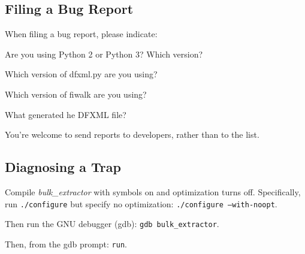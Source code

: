 \documentclass[10pt,twoside]{article}
\newcommand{\bulk}{\emph{bulk\_extractor}\xspace}
\newcommand{\bev}{\emph{BEViewer}\xspace}
\begin{document}
\subsection{Filing a Bug Report}
When filing a bug report, please indicate:
\begin{compactenum}
\item Are you using Python 2 or Python 3? Which version?
\item Which version of dfxml.py are you using?
\item Which  version of fiwalk are you using?
\item What generated he DFXML file?
\end{compactenum}
You're welcome to send reports to developers, rather than to the list.

\subsection{Diagnosing a Trap}
\begin{compactenum}
\item Compile \bulk with symbols on and optimization turns off.
Specifically, run \texttt{./configure}
but specify no optimization: \texttt{./configure --with-noopt}.
\item Then run the GNU debugger (gdb): \texttt{gdb bulk\_extractor}.
\item Then, from the gdb prompt: \texttt{run}.
\end{compactenum}


\cleardoublepage



\cleardoublepage
\printglossaries

\begin{comment}
\section{Vocabulary}
\bev
\bulk
Feature
Feature File
Histogram File
Histogram
Referenced Feature File
Referenced Features
Bookmarked Features
Report
Case
Navigate
Navigation History
Path
Offset
Image File
Image
Address Base
Highlight
Highlight Source
Filter
Log
System Clipboard
Image Reader
\end{comment}
\end{document}

